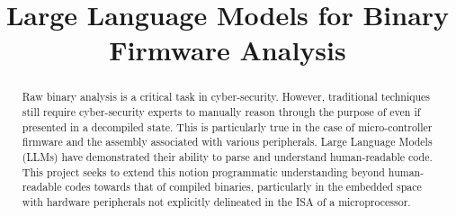 \documentclass[conference,compsoc]{IEEEtran}
\begin{document}
\title{Large Language Models for Binary Firmware Analysis}


\author{
\and
{}
}

\maketitle

\begin{abstract}

Raw binary analysis is a critical task in cyber-security. However, traditional techniques still require cyber-security experts to manually reason through the purpose of even if presented in a decompiled state. This is particularly true in the case of micro-controller firmware and the assembly associated with various peripherals. Large Language Models (LLMs) have demonstrated their ability to parse and understand human-readable code. This project seeks to extend this notion programmatic understanding beyond human-readable codes towards that of compiled binaries, particularly in the embedded space with hardware peripherals not explicitly delineated in the ISA of a microprocessor.

\end{abstract}
\end{document}
